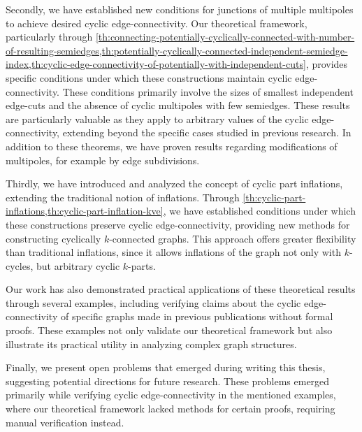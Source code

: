 \documentclass[12pt, twoside]{book}
\begin{document}
Secondly, we have established new conditions for junctions of multiple multipoles to achieve desired cyclic edge-connectivity. Our theoretical framework, particularly through \cref{th:connecting-potentially-cyclically-connected-with-number-of-resulting-semiedges,th:potentially-cyclically-connected-independent-semiedge-index,th:cyclic-edge-connectivity-of-potentially-with-independent-cuts}, provides specific conditions under which these constructions maintain cyclic edge-connectivity. These conditions primarily involve the sizes of smallest independent edge-cuts and the absence of cyclic multipoles with few semiedges. These results are particularly valuable as they apply to arbitrary values of the cyclic edge-connectivity, extending beyond the specific cases studied in previous research. In addition to these theorems, we have proven results regarding modifications of multipoles, for example by edge subdivisions.

Thirdly, we have introduced and analyzed the concept of cyclic part inflations, extending the traditional notion of inflations. Through \cref{th:cyclic-part-inflations,th:cyclic-part-inflation-kve}, we have established conditions under which these constructions preserve cyclic edge-connectivity, providing new methods for constructing cyclically $k$-connected graphs. This approach offers greater flexibility than traditional inflations, since it allows inflations of the graph not only with $k$-cycles, but arbitrary cyclic $k$-parts.

Our work has also demonstrated practical applications of these theoretical results through several examples, including verifying claims about the cyclic edge-connectivity of specific graphs made in previous publications without formal proofs. These examples not only validate our theoretical framework but also illustrate its practical utility in analyzing complex graph structures.

Finally, we present open problems that emerged during writing this thesis, suggesting potential directions for future research. These problems emerged primarily while verifying cyclic edge-connectivity in the mentioned examples, where our theoretical framework lacked methods for certain proofs, requiring manual verification instead.

\newpage
\thispagestyle{empty}




\end{document}
